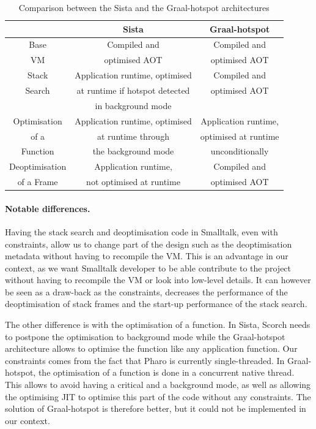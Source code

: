 \documentclass[a4paper,12pt,twoside]{../includes/ThesisStyle}
\begin{document}
\begin{table}
  \caption{Comparison between the Sista and the Graal-hotspot architectures}
  \vspace{0.1cm}
  \centering
  \begin{tabular}{c||c|c}
    \toprule
    & Sista & Graal-hotspot \\
    \midrule
    \midrule
	Base & Compiled and & Compiled and \\
	VM & optimised AOT & optimised AOT \\
    \midrule
	Stack & Application runtime, optimised & Compiled and \\
	Search & at runtime if hotspot detected & optimised AOT \\
	 & in background mode & \\
    \midrule
	Optimisation & Application runtime, optimised & Application runtime,\\
	of a & at runtime through & optimised at runtime \\
	Function & the background mode & unconditionally \\
    \midrule
	Deoptimisation & Application runtime, & Compiled and \\
	of a Frame & not optimised at runtime & optimised AOT \\
	\bottomrule
  \end{tabular}
  \label{tbl:comparison}
\end{table}

\paragraph{Notable differences.}Having the stack search and deoptimisation code in Smalltalk, even with constraints, allow us to change part of the design such as the deoptimisation metadata without having to recompile the VM. This is an advantage in our context, as we want Smalltalk developer to be able contribute to the project without having to recompile the VM or look into low-level details. It can however be seen as a draw-back as the constraints, decreases the performance of the deoptimisation of stack frames and the start-up performance of the stack search.

The other difference is with the optimisation of a function. In Sista, Scorch needs to postpone the optimisation to background mode while the Graal-hotspot architecture allows to optimise the function like any application function. Our constraints comes from the fact that Pharo is currently single-threaded. In Graal-hotspot, the optimisation of a function is done in a concurrent native thread. This allows to avoid having a critical and a background mode, as well as allowing the optimising JIT to optimise this part of the code without any constraints. The solution of Graal-hotspot is therefore better, but it could not be implemented in our context.
\end{document}
